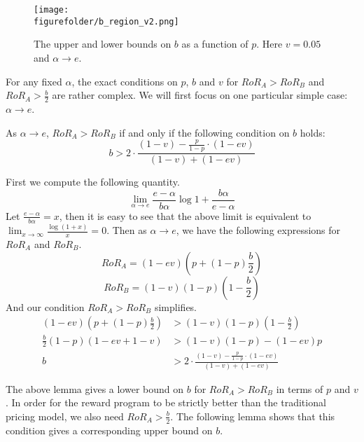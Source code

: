 \begin{figure*}[t]
\centering
\texttt{[image: \\figurefolder/b\_region\_v2.png]}
\caption{The upper and lower bounds on $b$ as a function of $p$. Here $v = 0.05$ and $\alpha \rightarrow e$.}
\label{fig:b_region}
\end{figure*}

For any fixed $\alpha$, the exact conditions on $p$, $b$ and $v$ for $RoR_A > RoR_B$ and $RoR_A > \frac{b}{2}$ are rather complex. We will first focus on one particular simple case: $\alpha \rightarrow e$. 

\begin{lemma}
As $\alpha \rightarrow e$, $RoR_A > RoR_B$ if and only if the following condition on $b$ holds:
\begin{equation}
b > 2\cdot \frac{(1-v) - \frac{p}{1-p}\cdot (1-ev)}{(1-v) + (1-ev)}
\end{equation}
\end{lemma} 
\proof
First we compute the following quantity.
\begin{equation*}
\lim_{\alpha \to e} \frac{e-\alpha}{b\alpha}\log{1+\frac{b\alpha}{e-\alpha}}
\end{equation*}
Let $\frac{e-\alpha}{b\alpha} = x$, then it is easy to see that the above limit is equivalent to $\lim_{x\to \infty} \frac{\log(1+x)}{x} = 0$. Then as $\alpha \rightarrow e$, we have the following expressions for $RoR_A$ and $RoR_B$.
\begin{equation*}
RoR_A = (1-ev)\left(p+(1-p)\frac{b}{2} \right)
\end{equation*}
\begin{equation*}
RoR_B = (1-v)(1-p)\left(1-\frac{b}{2} \right)
\end{equation*}
And our condition $RoR_A > RoR_B$ simplifies.
\begin{align*}
(1-ev)\left(p+(1-p)\frac{b}{2} \right) &> (1-v)(1-p)\left(1-\frac{b}{2} \right) \\
\frac{b}{2}(1-p)(1-ev+1-v) &> (1-v)(1-p)-(1-ev)p \\
b &> 2\cdot \frac{(1-v) - \frac{p}{1-p}\cdot (1-ev)}{(1-v) + (1-ev)} 
\end{align*}

\endproof

The above lemma gives a lower bound on $b$ for $RoR_A > RoR_B$ in terms of $p$ and $v$. In order for the reward program to be strictly better than the traditional pricing model, we also need $RoR_A > \frac{b}{2}$. The following lemma shows that this condition gives a corresponding upper bound on $b$.

